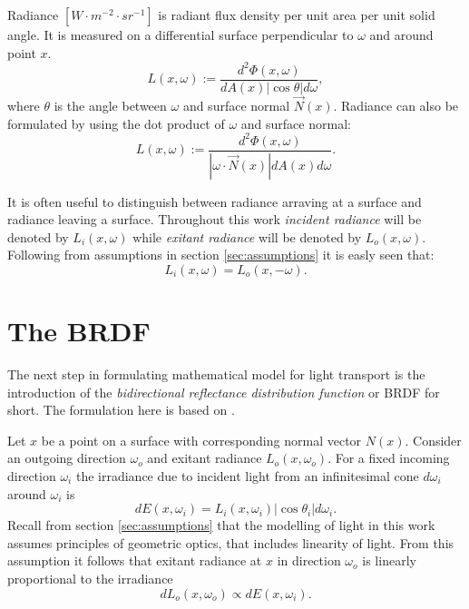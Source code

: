 \begin{df}
Radiance $[W \cdot m^{-2} \cdot sr^{-1}]$ is radiant flux density per unit area per unit solid angle. It is measured on a differential surface perpendicular to $\omega$ and around point $x$.
\begin{equation}
  L(x,\omega) := \frac{d^{2}\Phi(x, \omega)}{dA(x) |\cos\theta| d\omega},
\end{equation}
where $\theta$ is the angle between $\omega$ and surface normal $\vec{N}(x)$. Radiance can also be formulated by using the dot product of $\omega$ and surface normal:
\begin{equation}
  L(x, \omega) := \frac{d^{2}\Phi(x, \omega)}{|\omega \cdot \vec{N}(x)| dA(x) d\omega}.
\end{equation}
\end{df}

It is often useful to distinguish between radiance arraving at a surface and radiance leaving a surface. Throughout this work \emph{incident radiance} will be denoted by $L_{i}(x, \omega)$ while \emph{exitant radiance} will be denoted by $L_{o}(x, \omega)$. Following from assumptions in section \ref{sec:assumptions} it is easly seen that:
\begin{equation}
  L_{i}(x, \omega) = L_{o}(x, -\omega).
\end{equation}

\section{The BRDF}
The next step in formulating mathematical model for light transport is the introduction of the \emph{bidirectional reflectance distribution function} or BRDF for short. The formulation here is based on \cite{veach97}.

Let $x$ be a point on a surface with corresponding normal vector $N(x)$. Consider an outgoing direction $\omega_{o}$ and exitant radiance $L_{o}(x, \omega_{o})$. For a fixed incoming direction $\omega_{i}$ the irradiance due to incident light from an infinitesimal cone $d\omega_{i}$ around $\omega_{i}$ is
\begin{equation}
  dE(x, \omega_{i}) = L_{i}(x, \omega_{i}) |\cos\theta_{i}| d\omega_{i}.
\end{equation}
Recall from section \ref{sec:assumptions} that the modelling of light in this work assumes principles of geometric optics, that includes linearity of light. From this assumption it follows that exitant radiance at $x$ in direction $\omega_{o}$ is linearly proportional to the irradiance
\begin{equation}
  dL_{o}(x, \omega_{o}) \propto dE(x, \omega_{i}).
\end{equation}

